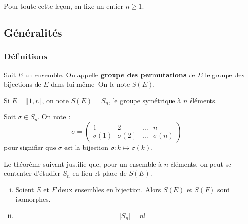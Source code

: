 



	
	Pour toute cette leçon, on fixe un entier $n \geq 1$.

	\subsection{Généralités}
	
	\subsubsection{Définitions}
	
	
	\begin{definition}
		Soit $E$ un ensemble. On appelle \textbf{groupe des permutations} de $E$ le groupe des bijections de $E$ dans lui-même. On le note $S(E)$.
	\end{definition}
	
	\begin{notation}
		Si $E = \llbracket 1, n \rrbracket$, on note $S(E) = S_n$, le groupe symétrique à $n$ éléments.
	\end{notation}
	
	\begin{notation}
		Soit $\sigma \in S_n$. On note :
		\[
			\sigma =
			\begin{pmatrix}
				1 & 2 & \dots & n \\
				\sigma(1) & \sigma(2) & \dots & \sigma(n)
			\end{pmatrix}
		\]
		pour signifier que $\sigma$ est la bijection $\sigma : k \mapsto \sigma(k)$.
	\end{notation}
	
	Le théorème suivant justifie que, pour un ensemble à $n$ éléments, on peut se contenter d'étudier $S_n$ en lieu et place de $S(E)$.
	
	\begin{theorem}
		\begin{enumerate}[(i)]
			\item Soient $E$ et $F$ deux ensembles en bijection. Alors $S(E)$ et $S(F)$ sont isomorphes.
			\item \[ |S_n| = n! \]
		\end{enumerate}
	\end{theorem}
	
	
